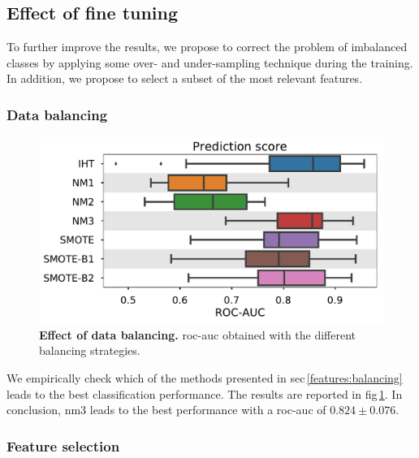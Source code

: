 \documentclass[final,3p,times,twocolumn]{elsarticle}
\begin{document}
\subsection{Effect of fine tuning}

To further improve the results, we propose to correct the problem of imbalanced
classes by applying some over- and under-sampling technique during the
training. In addition, we propose to select a subset of the most relevant
features.

\subsubsection{Data balancing}\label{exp:balancing}

\begin{figure}
  \centering
  \includegraphics[width=0.8\linewidth]{images/box_plot_balancing_all.pdf}
  \caption[Balancing]{\textbf{Effect of data balancing.} \ac{roc}-\ac{auc}
    obtained with the different balancing strategies.}
  \label{fig:balancing}
\end{figure}

We empirically check which of the methods presented in
\acs{sec}\,\ref{features:balancing} leads to the best classification
performance. The results are reported in \acs{fig}\,\ref{fig:balancing}. In
conclusion, \Ac{nm3} leads to the best performance with a \ac{roc}-\ac{auc} of
$0.824 \pm 0.076$.

\subsubsection{Feature selection}\label{exp:selection}
\end{document}
